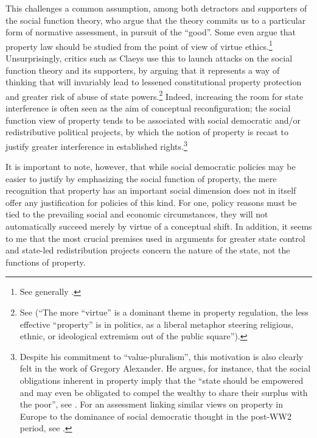 This challenges a common assumption, among both detractors and supporters of the social function theory, who argue that the theory commits us to a particular form of normative assessment, in pursuit of the ``good''. Some even argue that property law should be studied from the point of view of virtue ethics.\footnote{See generally \cite{penalver09}.} Unsurprisingly, critics such as Claeys use this to launch attacks on the social function theory and its supporters, by arguing that it represents a way of thinking that will invariably lead to lessened constitutional property protection and greater risk of abuse of state powers.\footnote{See \cite{claeys09} (``The more ``virtue'' is a dominant theme in property regulation, the less effective ``property'' is in politics, as a liberal metaphor steering religious, ethnic, or ideological extremism out of the public square'').} Indeed, increasing the room for state interference is often seen as the aim of conceptual reconfiguration; the social function view of property tends to be associated with social democratic and/or redistributive political projects, by which the notion of property is recast to justify greater interference in established rights.\footnote{Despite his commitment to ``value-pluralism'', this motivation is also clearly felt in the work of Gregory Alexander. He argues, for instance, that the social obligations inherent in property imply that the ``state should be empowered and may even be obligated to compel the wealthy to share their surplus with the poor'', see \cite[746]{alexander09}. For an assessment linking similar views on property in Europe to the dominance of social democratic thought in the post-WW2 period, see \cite{allen10}.}

It is important to note, however, that while social democratic policies may be easier to justify by emphasizing the social function of property, the mere recognition that property has an important social dimension does not in itself offer any justification for policies of this kind. For one, policy reasons must be tied to the prevailing social and economic circumstances, they will not automatically succeed merely by virtue of a conceptual shift. In addition, it seems to me that the most crucial premises used in arguments for greater state control and state-led redistribution projects concern the nature of the state, not the functions of property.

